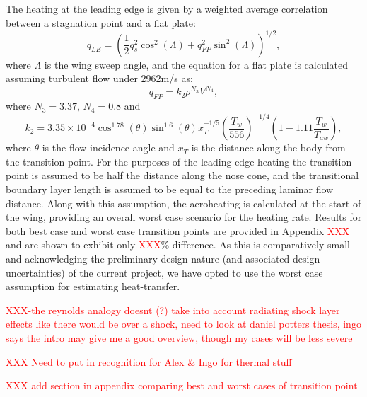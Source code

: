 The heating at the leading edge is given by a weighted average correlation between a stagnation point and a flat plate\cite{Dirkx,Tauber2008}:
\begin{equation}
q_{LE} = (\frac{1}{2}q_s^2 \cos^2(\Lambda) + q_{FP}^2 \sin^2(\Lambda))^{1/2},
\end{equation}
where $\Lambda$ is the wing sweep angle, and the equation for a flat plate is calculated assuming turbulent flow under 2962m/s as:
\begin{equation}
q_{FP} = k_2\rho^{N_3}V^{N_4},
\end{equation}
where $N_3 = 3.37$, $N_4 = 0.8$ and
\begin{equation}
k_2 = 3.35 \times 10^{-4} \cos^{1.78}(\theta) \sin^{1.6}(\theta) x_T^{-1/5} (\frac{T_w}{556})^{-1/4} (1 - 1.11\frac{T_w}{T_{aw}}),
\end{equation}
where $\theta$ is the flow incidence angle and $x_T$ is the distance along the body from the transition point\cite{Dirkx,Tauber2008}. For the purposes of the leading edge heating the transition point is assumed to be half the distance along the nose cone, and the transitional boundary layer length is assumed to be equal to the preceding laminar flow distance. Along with this assumption, the aeroheating is calculated at the start of the wing, providing an overall worst case scenario for the heating rate. Results for both best case and worst case transition points are provided in Appendix \textcolor{red}{XXX} and are shown to exhibit only \textcolor{red}{XXX}\% difference. As this is comparatively small and acknowledging the preliminary design nature (and associated design uncertainties) of the current project, we have opted to use the worst case assumption for estimating heat-transfer.

\textcolor{red}{XXX-the reynolds analogy doesnt (?) take into account radiating shock layer effects like there would be over a shock, need to look at daniel potters thesis, ingo says the intro may give me a good overview, though my cases will be less severe}

\textcolor{red}{XXX Need to put in recognition for Alex \& Ingo for thermal stuff}

\textcolor{red}{XXX add section in appendix comparing best and worst cases of transition point}

